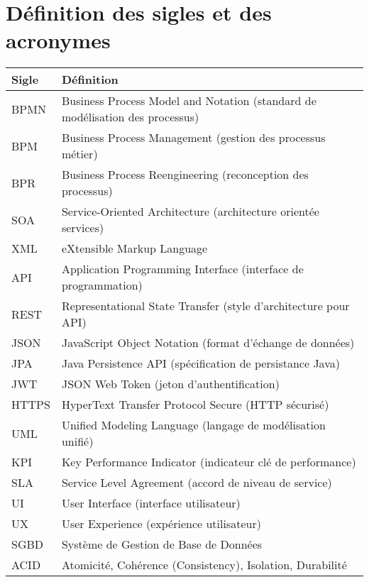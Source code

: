 \documentclass[12pt,a4paper,oneside]{extbook}
\begin{document}
\section*{Définition des sigles et des acronymes}
\begin{table}[H]
   \centering
   \begin{adjustbox}{max width=\textwidth}
   \begin{tabularx}{1.0\textwidth}{|l|X|}
     \hline
     \textbf{Sigle} & \textbf{Définition} \\
     \hline
     BPMN & Business Process Model and Notation (standard de modélisation des processus) \\
     \hline
     BPM & Business Process Management (gestion des processus métier) \\
     \hline
     BPR & Business Process Reengineering (reconception des processus) \\
     \hline
     SOA & Service-Oriented Architecture (architecture orientée services) \\
     \hline
     XML & eXtensible Markup Language \\
     \hline
     API & Application Programming Interface (interface de programmation) \\
     \hline
     REST & Representational State Transfer (style d’architecture pour API) \\
     \hline
     JSON & JavaScript Object Notation (format d’échange de données) \\
     \hline
     JPA & Java Persistence API (spécification de persistance Java) \\
     \hline
     JWT & JSON Web Token (jeton d’authentification) \\
     \hline
     HTTPS & HyperText Transfer Protocol Secure (HTTP sécurisé) \\
     \hline
     UML & Unified Modeling Language (langage de modélisation unifié) \\
     \hline
     KPI & Key Performance Indicator (indicateur clé de performance) \\
     \hline
     SLA & Service Level Agreement (accord de niveau de service) \\
     \hline
     UI & User Interface (interface utilisateur) \\
     \hline
     UX & User Experience (expérience utilisateur) \\
     \hline
     SGBD & Système de Gestion de Base de Données \\
     \hline
     ACID & Atomicité, Cohérence (Consistency), Isolation, Durabilité \\

\end{tabularx}
\end{adjustbox}
\end{table}
\end{document}
